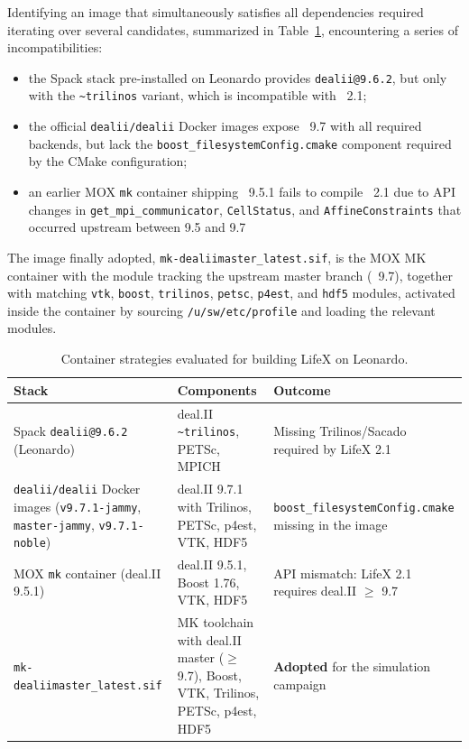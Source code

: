 Identifying an image that simultaneously satisfies all \textbf{\lifex} dependencies required iterating over several candidates, summarized in Table~\ref{tab:container_attempts}, encountering a series of incompatibilities:
\begin{itemize}[itemsep=2ex, topsep=2ex]
    \item[-] the Spack stack pre-installed on Leonardo provides \texttt{dealii@9.6.2}, but only with the \texttt{\textasciitilde{}trilinos} variant, which is incompatible with \textbf{\lifex}~2.1;
    \item[-] the official \texttt{dealii/dealii} Docker images expose \dealii~9.7 with all required backends, but lack the \texttt{boost\_filesystemConfig.cmake} component required by the \textbf{\lifex} CMake configuration;
    \item[-] an earlier MOX \texttt{mk} container shipping \dealii~9.5.1 fails to compile \textbf{\lifex}~2.1 due to API changes in \texttt{get\_mpi\_communicator}, \texttt{CellStatus}, and \texttt{AffineConstraints} that occurred upstream between 9.5 and 9.7
\end{itemize}
The image finally adopted, \texttt{mk-dealiimaster\_latest.sif}, is the MOX MK container with the \dealii module tracking the upstream master branch (\dealii~9.7), together with matching \texttt{vtk}, \texttt{boost}, \texttt{trilinos}, \texttt{petsc}, \texttt{p4est}, and \texttt{hdf5} modules, activated inside the container by sourcing \texttt{/u/sw/etc/profile} and loading the relevant modules.

\begin{table}[h!]
  \centering
  \footnotesize
  \begin{tabular}{p{} p{} p{}}
    \hline
    \textbf{Stack} & \textbf{Components} & \textbf{Outcome} \\
    \hline
    Spack \texttt{dealii@9.6.2} (Leonardo) &
    deal.II \texttt{\textasciitilde{}trilinos}, PETSc, MPICH &
    Missing Trilinos/Sacado required by LifeX 2.1 \\
    \texttt{dealii/dealii} Docker images (\texttt{v9.7.1-jammy}, \texttt{master-jammy}, \texttt{v9.7.1-noble}) &
    deal.II 9.7.1 with Trilinos, PETSc, p4est, VTK, HDF5 &
    \texttt{boost\_filesystemConfig.cmake} missing in the image \\
    MOX \texttt{mk} container (deal.II 9.5.1) &
    deal.II 9.5.1, Boost 1.76, VTK, HDF5 &
    API mismatch: LifeX 2.1 requires deal.II $\geq$ 9.7 \\
    \texttt{mk-dealiimaster\_latest.sif} &
    MK toolchain with deal.II master ($\geq$ 9.7), Boost, VTK, Trilinos, PETSc, p4est, HDF5 &
    \textbf{Adopted} for the simulation campaign \\
    \hline
  \end{tabular}
  \caption{Container strategies evaluated for building LifeX on Leonardo.}
  \label{tab:container_attempts}
\end{table}

